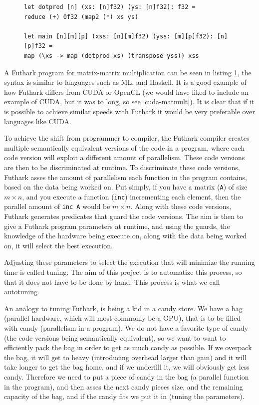\begin{figure}
\centering
\lstset{language=haskell}
\begin{lstlisting}
let dotprod [n] (xs: [n]f32) (ys: [n]f32): f32 =
reduce (+) 0f32 (map2 (*) xs ys)

let main [n][m][p] (xss: [n][m]f32) (yss: [m][p]f32): [n][p]f32 =
map (\xs -> map (dotprod xs) (transpose yss)) xss
\end{lstlisting}%
\label{IntromatmultFuthark}
\end{figure}
A Futhark program for matrix-matrix multiplication can be seen in listing
\ref{IntromatmultFuthark}, the syntax is similar to languages such as ML, and
Haskell. It is a good example of how Futhark differs from CUDA or OpenCL (we
would have liked to include an example of CUDA, but it was to long, so see
\ref{cuda-matmult}). It is clear that if it is possible to achieve similar speeds 
with Futhark it would be very preferable over languages like CUDA.


To achieve the shift from programmer to compiler, the Futhark compiler creates multiple semantically
equivalent versions of the code in a program, where each code version will
exploit a different amount of parallelism. These code versions are then to be
discriminated at runtime. To discriminate these code versions, Futhark asses
the amount of parallelism each function in the program contains, based on the
data being worked on. Put simply, if you have a matrix (\texttt{A}) of size $m
\times n$, and you execute a function (\texttt{inc}) incrementing each element,
then the parallel amount of \texttt{inc A} would be $m \times n$. Along with
these code versions, Futhark generates predicates that guard the code versions.
The aim is then to give a Futhark program parameters at runtime, and using the
guards, the knowledge of the hardware being execute on, along with the data
being worked on, it will select the best execution.

Adjusting these parameters to select the execution that will minimize the
running time is called tuning. The aim of this project is to automatize this
process, so that it does not have to be done by hand. This process is what we
call autotuning.

An analogy to tuning Futhark, is being a kid in a candy store. We have a bag
(parallel hardware, which will most commonly be a GPU), that is to be filled
with candy (parallelism in a program). We do not have a favorite type of candy
(the code versions being semantically equivalent), so we want to want to
efficiently pack the bag in order to get as much candy as possible. If we
overpack the bag, it will get to heavy (introducing overhead larger than gain)
and it will take longer to get the bag home, and if we underfill it, we will
obviously get less candy. Therefore we need to put a piece of candy in the bag
(a parallel function in the program), and then asses the next candy pieces
size, and the remaining capacity of the bag, and if the candy fits we put it in
(tuning the parameters). 

